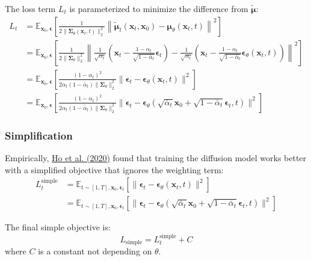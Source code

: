 \documentclass[12pt]{article}
\begin{document}
The loss term $L_t$ is parameterized to minimize the difference from $\tilde{\boldsymbol{\mu}}$:
\[
\begin{aligned}
L_t 
&= \mathbb{E}_{\mathbf{x}_0, \boldsymbol{\epsilon}} \left[\frac{1}{2 \| \boldsymbol{\Sigma}_\theta(\mathbf{x}_t, t) \|^2_2} \left\| \tilde{\boldsymbol{\mu}}_t(\mathbf{x}_t, \mathbf{x}_0) - \boldsymbol{\mu}_\theta(\mathbf{x}_t, t) \right\|^2 \right] \\
&= \mathbb{E}_{\mathbf{x}_0, \boldsymbol{\epsilon}} \left[\frac{1}{2  \|\boldsymbol{\Sigma}_\theta \|^2_2} \left\| \frac{1}{\sqrt{\alpha_t}} \left( \mathbf{x}_t - \frac{1 - \alpha_t}{\sqrt{1 - \bar{\alpha}_t}} \boldsymbol{\epsilon}_t \right) - \frac{1}{\sqrt{\alpha_t}} \left( \mathbf{x}_t - \frac{1 - \alpha_t}{\sqrt{1 - \bar{\alpha}_t}} \boldsymbol{\epsilon}_\theta(\mathbf{x}_t, t) \right) \right\|^2 \right] \\
&= \mathbb{E}_{\mathbf{x}_0, \boldsymbol{\epsilon}} \left[\frac{ (1 - \alpha_t)^2 }{2 \alpha_t (1 - \bar{\alpha}_t) \| \boldsymbol{\Sigma}_\theta \|^2_2} \|\boldsymbol{\epsilon}_t - \boldsymbol{\epsilon}_\theta(\mathbf{x}_t, t)\|^2 \right] \\
&= \mathbb{E}_{\mathbf{x}_0, \boldsymbol{\epsilon}} \left[\frac{ (1 - \alpha_t)^2 }{2 \alpha_t (1 - \bar{\alpha}_t) \| \boldsymbol{\Sigma}_\theta \|^2_2} \|\boldsymbol{\epsilon}_t - \boldsymbol{\epsilon}_\theta(\sqrt{\bar{\alpha}_t}\mathbf{x}_0 + \sqrt{1 - \bar{\alpha}_t}\boldsymbol{\epsilon}_t, t)\|^2 \right] 
\end{aligned}
\]

\subsubsection*{Simplification}
Empirically, \href{https://arxiv.org/abs/2006.11239}{Ho et al. (2020)} found that training the diffusion model works better with a simplified objective that ignores the weighting term:
\[
\begin{aligned}
L_t^\text{simple}
&= \mathbb{E}_{t \sim [1, T], \mathbf{x}_0, \boldsymbol{\epsilon}_t} \left[\|\boldsymbol{\epsilon}_t - \boldsymbol{\epsilon}_\theta(\mathbf{x}_t, t)\|^2 \right] \\
&= \mathbb{E}_{t \sim [1, T], \mathbf{x}_0, \boldsymbol{\epsilon}_t} \left[\|\boldsymbol{\epsilon}_t - \boldsymbol{\epsilon}_\theta(\sqrt{\bar{\alpha}_t}\mathbf{x}_0 + \sqrt{1 - \bar{\alpha}_t}\boldsymbol{\epsilon}_t, t)\|^2 \right]
\end{aligned}
\]

The final simple objective is:
\[
L_\text{simple} = L_t^\text{simple} + C
\]
where $C$ is a constant not depending on $\theta$.
\end{document}

